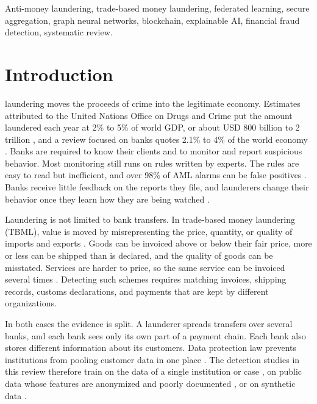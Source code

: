 \documentclass[journal]{IEEEtran}
\begin{document}
\begin{IEEEkeywords}
Anti-money laundering, trade-based money laundering, federated learning, secure aggregation, graph neural networks, blockchain, explainable AI, financial fraud detection, systematic review.
\end{IEEEkeywords}

\section{Introduction}

 laundering moves the proceeds of crime into the legitimate economy. Estimates attributed to the United Nations Office on Drugs and Crime put the amount laundered each year at 2\% to 5\% of world GDP, or about USD 800 billion to 2 trillion \cite{raj2024ai}, and a review focused on banks quotes 2.1\% to 4\% of the world economy \cite{jensen2023fighting}. Banks are required to know their clients and to monitor and report suspicious behavior. Most monitoring still runs on rules written by experts. The rules are easy to read but inefficient, and over 98\% of AML alarms can be false positives \cite{jensen2023fighting}. Banks receive little feedback on the reports they file, and launderers change their behavior once they learn how they are being watched \cite{jensen2023fighting}.

Laundering is not limited to bank transfers. In trade-based money laundering (TBML), value is moved by misrepresenting the price, quantity, or quality of imports and exports \cite{fatf2006tbml,tiwari2025tbml}. Goods can be invoiced above or below their fair price, more or less can be shipped than is declared, and the quality of goods can be misstated. Services are harder to price, so the same service can be invoiced several times \cite{tiwari2025tbml}. Detecting such schemes requires matching invoices, shipping records, customs declarations, and payments that are kept by different organizations.

In both cases the evidence is split. A launderer spreads transfers over several banks, and each bank sees only its own part of a payment chain. Each bank also stores different information about its customers. Data protection law prevents institutions from pooling customer data in one place \cite{awosika2024xai}. The detection studies in this review therefore train on the data of a single institution or case \cite{irshad2024gcfmld,luo2024mlad}, on public data whose features are anonymized and poorly documented \cite{ferretti2025gnn}, or on synthetic data \cite{mao2026pmegnn,amber2026cbdc}.
\end{document}
